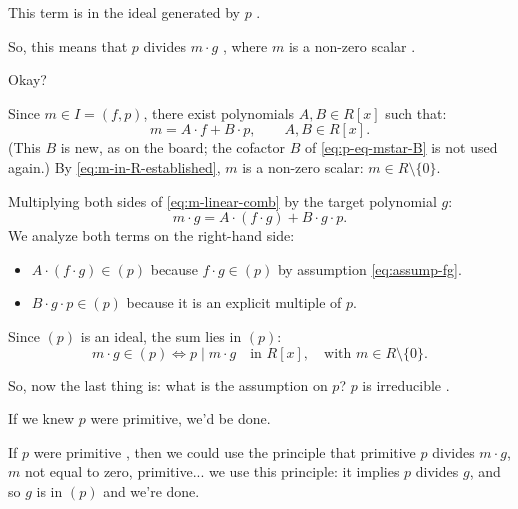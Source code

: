 \begin{proofWrapper}
\begin{speech}[00:36:24 - 00:37:08]
This term is in the ideal generated by $p$ .

So, this means that $p$ divides $m \cdot g$ , where $m$ is a non-zero scalar .

Okay?
\end{speech}

\begin{content}
Since $m \in I = (f, p)$, there exist polynomials $A, B \in R[x]$ such that:
\begin{equation}\label{eq:m-linear-comb}
m = A \cdot f + B \cdot p, \qquad A, B \in R[x].
\end{equation}
(This $B$ is new, as on the board; the cofactor $B$ of \eqref{eq:p-eq-mstar-B} is not used again.) By \eqref{eq:m-in-R-established}, $m$ is a non-zero scalar: $m \in R \setminus \{0\}$.

Multiplying both sides of \eqref{eq:m-linear-comb} by the target polynomial $g$:
\begin{equation}\label{eq:mg-expanded}
m \cdot g = A \cdot (f \cdot g) + B \cdot g \cdot p.
\end{equation}
We analyze both terms on the right-hand side:
\begin{itemize}
    \item $A \cdot (f \cdot g) \in (p)$ because $f \cdot g \in (p)$ by assumption \eqref{eq:assump-fg}.
    \item $B \cdot g \cdot p \in (p)$ because it is an explicit multiple of $p$.
\end{itemize}
Since $(p)$ is an ideal, the sum lies in $(p)$:
\[
m \cdot g \in (p) \iff p \mid m \cdot g \quad \text{in } R[x], \quad \text{with } m \in R \setminus \{0\}.
\]
\end{content}

\begin{speech}[00:37:08 - 00:39:19]
So, now the last thing is: what is the assumption on $p$? $p$ is irreducible .

If we knew $p$ were primitive, we'd be done.

If $p$ were primitive , then we could use the principle that primitive $p$ divides $m \cdot g$, $m$ not equal to zero, primitive...  we use this principle: it implies $p$ divides $g$, and so $g$ is in $(p)$ and we're done.


\end{speech}
\end{proofWrapper}
